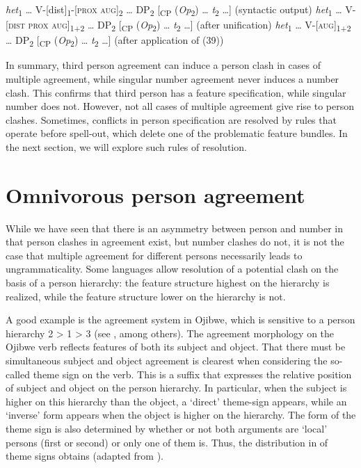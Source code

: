 \documentclass[output=paper]{langsci/langscibook}
\begin{document}
\ea \label{bkm:Ref295575416}  

\ea \textit{het}\textsubscript{1} … V-[dist]\textsubscript{1}{}-[\textsc{prox} \textsc{aug}]\textsubscript{2} … DP\textsubscript{2} [\textsubscript{CP} (\textit{Op}\textsubscript{2}) … \textit{t}\textsubscript{2} …]   (syntactic output)
\ex \textit{het}\textsubscript{1} … V-[\textsc{dist prox} \textsc{aug}]\textsubscript{1+2} … DP\textsubscript{2} [\textsubscript{CP} (\textit{Op}\textsubscript{2}) … \textit{t}\textsubscript{2} …]   (after unification)
\ex  \textit{het}\textsubscript{1} … V-[\textsc{aug}]\textsubscript{1+2} … DP\textsubscript{2} [\textsubscript{CP} (\textit{Op}\textsubscript{2}) … \textit{t}\textsubscript{2} …]     (after application of (39))
\z \z

In summary, third person agreement can induce a person clash in cases of multiple agreement, while singular number agreement never induces a number clash. This confirms that third person has a feature specification, while singular number does not. However, not all cases of multiple agreement give rise to person clashes. Sometimes, conflicts in person specification are resolved by rules that operate before spell-out, which delete one of the problematic feature bundles. In the next section, we will explore such rules of resolution.

\section{Omnivorous person agreement}%

While we have seen that there is an asymmetry between person and number in that person clashes in agreement exist, but number clashes do not, it is not the case that multiple agreement for different persons necessarily leads to ungrammaticality. Some languages allow resolution of a potential clash on the basis of a person hierarchy: the feature structure highest on the hierarchy is realized, while the feature structure lower on the hierarchy is not. 

  A good example is the agreement system in Ojibwe, which is sensitive to a person hierarchy 2 > 1 > 3 (see \citealt{Valentine2001}, among others). The agreement morphology on the Ojibwe verb reflects features of both its subject and object. That there must be simultaneous subject and object agreement is clearest when considering the so-called theme sign on the verb. This is a suffix that expresses the relative position of subject and object on the person hierarchy. In particular, when the subject is higher on this hierarchy than the object, a ‘direct’ theme-sign appears, while an ‘inverse’ form appears when the object is higher on the hierarchy. The form of the theme sign is also determined by whether or not both arguments are ‘local’ persons (first or second) or only one of them is. Thus, the distribution in  of theme signs obtains (adapted from \citealt{Lochbihler2008}).
\end{document}

